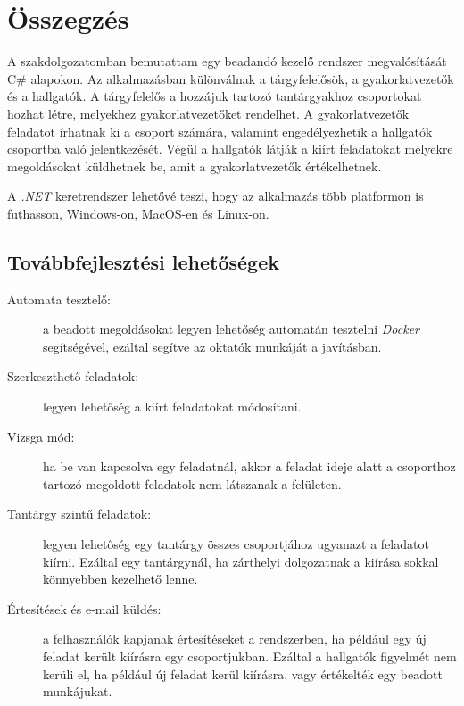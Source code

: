 \chapter{Összegzés} %
\label{ch:sum}
A szakdolgozatomban bemutattam egy beadandó kezelő rendszer megvalósítását C\# alapokon. Az alkalmazásban különválnak a tárgyfelelősök, a gyakorlatvezetők és a hallgatók. A tárgyfelelős a hozzájuk tartozó tantárgyakhoz csoportokat hozhat létre, melyekhez gyakorlatvezetőket rendelhet. A gyakorlatvezetők feladatot írhatnak ki a csoport számára, valamint engedélyezhetik a hallgatók csoportba való jelentkezését. Végül a hallgatók látják a kiírt feladatokat melyekre megoldásokat küldhetnek be, amit a gyakorlatvezetők értékelhetnek.

A \emph{.NET} keretrendszer lehetővé teszi, hogy az alkalmazás több platformon is futhasson, Windows-on, MacOS-en és Linux-on.
\section{Továbbfejlesztési lehetőségek}
\begin{description}
    \item[Automata tesztelő:] a beadott megoldásokat legyen lehetőség automatán tesztelni \emph{Docker} segítségével, ezáltal segítve az oktatók munkáját a javításban.
    \item[Szerkeszthető feladatok:] legyen lehetőség a kiírt feladatokat módosítani.
    \item[Vizsga mód:] ha be van kapcsolva egy feladatnál, akkor a feladat ideje alatt a csoporthoz tartozó megoldott feladatok nem látszanak a felületen.
    \item[Tantárgy szintű feladatok:] legyen lehetőség egy tantárgy összes csoportjához ugyanazt a feladatot kiírni. Ezáltal egy tantárgynál, ha zárthelyi dolgozatnak a kiírása sokkal könnyebben kezelhető lenne.
    \item[Értesítések és e-mail küldés:] a felhasználók kapjanak értesítéseket a rendszerben, ha például egy új feladat került kiírásra egy csoportjukban. Ezáltal a hallgatók figyelmét nem kerüli el, ha például új feladat kerül kiírásra, vagy értékelték egy beadott munkájukat. 
\end{description}
